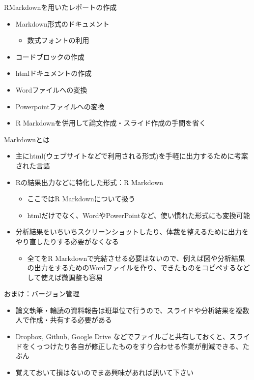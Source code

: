 \documentclass[
  ignorenonframetext,
]{beamer}
\providecommand{\tightlist}{%
  \setlength{\itemsep}{0pt}\setlength{\parskip}{0pt}}
\begin{document}
\begin{frame}{RMarkdownを用いたレポートの作成}
\protect\hypertarget{rmarkdownux3092ux7528ux3044ux305fux30ecux30ddux30fcux30c8ux306eux4f5cux6210}{}
\begin{itemize}
\tightlist
\item
  Markdown形式のドキュメント

  \begin{itemize}
  \tightlist
  \item
    数式フォントの利用
  \end{itemize}
\item
  コードブロックの作成
\item
  htmlドキュメントの作成
\item
  Wordファイルへの変換
\item
  Powerpointファイルへの変換
\item
  R Markdownを併用して論文作成・スライド作成の手間を省く
\end{itemize}

\begin{block}{Markdownとは}
\protect\hypertarget{markdownux3068ux306f}{}
\begin{itemize}
\tightlist
\item
  主にhtml(ウェブサイトなどで利用される形式)を手軽に出力するために考案された言語
\item
  Rの結果出力などに特化した形式：R Markdown

  \begin{itemize}
  \tightlist
  \item
    ここではR Markdownについて扱う
  \item
    htmlだけでなく、WordやPowerPointなど、使い慣れた形式にも変換可能
  \end{itemize}
\item
  分析結果をいちいちスクリーンショットしたり、体裁を整えるために出力をやり直したりする必要がなくなる

  \begin{itemize}
  \tightlist
  \item
    全てをR
    Markdownで完結させる必要はないので、例えば図や分析結果の出力をするためのWordファイルを作り、できたものをコピペするなどして使えば微調整も容易
  \end{itemize}
\end{itemize}
\end{block}
\end{frame}

\begin{frame}{おまけ：バージョン管理}
\protect\hypertarget{ux304aux307eux3051ux30d0ux30fcux30b8ux30e7ux30f3ux7ba1ux7406}{}
\begin{itemize}
\tightlist
\item
  論文執筆・輪読の資料報告は班単位で行うので、スライドや分析結果を複数人で作成・共有する必要がある
\item
  Dropbox, Github, Google Drive
  などでファイルごと共有しておくと、スライドをくっつけたり各自が修正したものをすり合わせる作業が削減できる、たぶん
\item
  覚えておいて損はないのでまあ興味があれば訊いて下さい
\end{itemize}
\end{frame}
\end{document}
